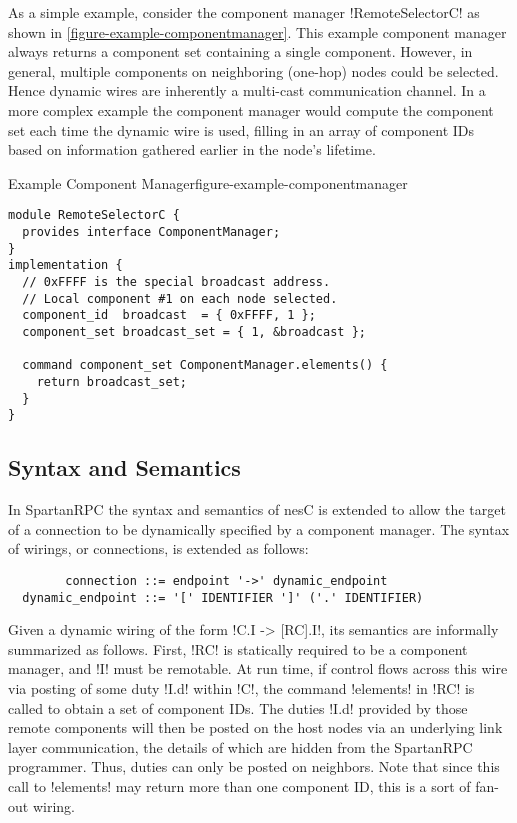 As a simple example, consider the component manager !RemoteSelectorC! as shown in
\autoref{figure-example-componentmanager}. This example component manager always returns a
component set containing a single component. However, in general, multiple components on
neighboring (one-hop) nodes could be selected. Hence dynamic wires are inherently a multi-cast
communication channel. In a more complex example the component manager would compute the
component set each time the dynamic wire is used, filling in an array of component IDs based on
information gathered earlier in the node's lifetime.

\begin{fpfig}[t]{Example Component Manager}{figure-example-componentmanager}
{
\singlespace
\begin{lstlisting}
module RemoteSelectorC {
  provides interface ComponentManager;
}
implementation {
  // 0xFFFF is the special broadcast address.
  // Local component #1 on each node selected.
  component_id  broadcast  = { 0xFFFF, 1 };
  component_set broadcast_set = { 1, &broadcast };

  command component_set ComponentManager.elements() {
    return broadcast_set;
  }
}
\end{lstlisting}
\primaryspacing
}
\end{fpfig}

\subsection{Syntax and Semantics}
\label{section-wiringsyntax}

In SpartanRPC the syntax and semantics of nesC is extended to allow the target of a connection
to be dynamically specified by a component manager. The syntax of wirings, or connections, is
extended as follows:

\singlespace
\begin{Verbatim}
        connection ::= endpoint '->' dynamic_endpoint
  dynamic_endpoint ::= '[' IDENTIFIER ']' ('.' IDENTIFIER)
\end{Verbatim}
\primaryspacing

Given a dynamic wiring of the form !C.I -> [RC].I!, its semantics are informally summarized as
follows. First, !RC! is statically required to be a component manager, and !I! must be
remotable. At run time, if control flows across this wire via posting of some duty !I.d! within
!C!, the command !elements! in !RC! is called to obtain a set of component IDs. The duties !I.d!
provided by those remote components will then be posted on the host nodes via an underlying link
layer communication, the details of which are hidden from the SpartanRPC programmer. Thus,
duties can only be posted on neighbors. Note that since this call to !elements! may return more
than one component ID, this is a sort of fan-out wiring.

